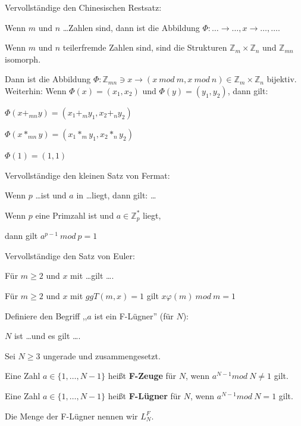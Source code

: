 \documentclass[avery5371, frame]{flashcards}
\begin{document}
\begin{flashcard}[Zahlentheorie]{Vervollständige den Chinesischen Restsatz:

        Wenn $m$ und $n$ \dots Zahlen sind, dann ist die Abbildung $\Phi:\dots\rightarrow\dots, x\rightarrow \dots,\dots$.}
    Wenn $m$ und $n$ teilerfremde Zahlen sind, sind die Strukturen $\mathbb{Z}_m \times\mathbb{Z}_n$ und $\mathbb{Z}_{mn}$ isomorph.

    Dann ist die Abbildung $\Phi:\mathbb{Z}_{mn} \owns x \rightarrow (x\ mod\ m, x\ mod\ n)\in\mathbb{Z}_m\times\mathbb{Z}_n$ bijektiv. Weiterhin: Wenn $\Phi(x)=(x_1,x_2)$ und $\Phi(y)=(y_1,y_2)$, dann gilt:
    \begin{itemize*}
        \item $\Phi(x+_{mn} y) = (x_1 +_m y_1 , x_2 +_n y_2)$
        \item $\Phi(x*_{mn} y) = (x_1 *_m y_1 , x_2 *_n y_2)$
        \item $\Phi(1) = (1,1)$
    \end{itemize*}
\end{flashcard}

\begin{flashcard}[Zahlentheorie]{Vervollständige den kleinen Satz von Fermat:

        Wenn $p$ \dots ist und $a$ in \dots liegt, dann gilt: \dots}
    Wenn $p$ eine Primzahl ist und $a\in\mathbb{Z}^*_p$ liegt,

    dann gilt $a^{p-1}\ mod\ p= 1$
\end{flashcard}

\begin{flashcard}[Zahlentheorie]{ Vervollständige den Satz von Euler:

        Für $m\geq 2$ und $x$ mit \dots gilt \dots .}
    Für $m\geq 2$ und $x$ mit $ggT(m,x) = 1$ gilt $x\varphi(m)\ mod\ m=1$
\end{flashcard}

\begin{flashcard}[Primzahlen]{Definiere den Begriff ,,$a$ ist ein F-Lügner'' (für $N$):

        $N$ ist \dots und es gilt \dots .}
    Sei $N\geq 3$ ungerade und zusammengesetzt.

    Eine Zahl $a\in\{1,\dots,N-1\}$ heißt \textbf{F-Zeuge} für $N$, wenn $a^{N-1} mod\ N\not= 1$ gilt.

    Eine Zahl $a\in\{1,\dots,N-1\}$ heißt \textbf{F-Lügner} für $N$, wenn $a^{N-1} mod\ N=1$ gilt.

    Die Menge der F-Lügner nennen wir $L^F_N$.
\end{flashcard}
\end{document}
